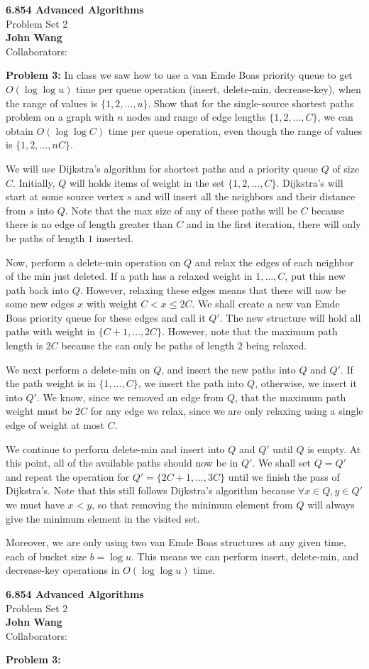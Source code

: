 \documentclass[psamsfonts]{amsart}
\newenvironment{sol}{\vspace{0.25cm}{\large \bfseries Solution:}}{\qedsymbol}
\newenvironment{prob}[1]{\begin{framed}{\large \bfseries Problem #1:}}{\end{framed}}
\newcommand{\makenewtitle}{
\begin{center}
{\huge \bfseries 6.854 Advanced Algorithms} \\
Problem Set 2\\
\vspace{0.25cm}
{\bfseries John Wang} \\
Collaborators:
\end{center}
\vspace{0.5cm}
}
\begin{document}
\newpage
\makenewtitle
\begin{prob}{3}
In class we saw how to use a van Emde Boas priority queue to get $O(\log \log u)$ time per queue operation (insert, delete-min, decrease-key), when the range of values is $\{1, 2, \ldots, u\}$. Show that for the single-source shortest paths problem on a graph with $n$ nodes and range of edge lengths $\{1,2,\ldots, C\}$, we can obtain $O(\log \log C)$ time per queue operation, even though the range of values is $\{1,2,\ldots, nC\}$. 
\end{prob}

\begin{sol}
We will use Dijkstra's algorithm for shortest paths and a priority queue $Q$ of size $C$. Initially, $Q$ will holds items of weight in the set $\{1,2,\ldots, C\}$. Dijkstra's will start at some source vertex $s$ and will insert all the neighbors and their distance from $s$ into $Q$. Note that the max size of any of these paths will be $C$ because there is no edge of length greater than $C$ and in the first iteration, there will only be paths of length $1$ inserted. 

Now, perform a delete-min operation on $Q$ and relax the edges of each neighbor of the min just deleted. If a path has a relaxed weight in $1, \ldots, C$, put this new path back into $Q$. However, relaxing these edges means that there will now be some new edges $x$ with weight $C < x \leq 2C$. We shall create a new van Emde Boas priority queue for these edges and call it $Q'$. The new structure will hold all paths with weight in $\{C+1, \ldots, 2C\}$. However, note that the maximum path length is $2C$ because the can only be paths of length $2$ being relaxed.

We next perform a delete-min on $Q$, and insert the new paths into $Q$ and $Q'$. If the path weight is in $\{1, \ldots, C\}$, we insert the path into $Q$, otherwise, we insert it into $Q'$. We know, since we removed an edge from $Q$, that the maximum path weight must be $2C$ for any edge we relax, since we are only relaxing using a single edge of weight at most $C$. 

We continue to perform delete-min and insert into $Q$ and $Q'$ until $Q$ is empty. At this point, all of the available paths should now be in $Q'$. We shall set $Q = Q'$ and repeat the operation for $Q' = \{2C+1, \ldots, 3C\}$ until we finish the pass of Dijkstra's. Note that this still follows Dijkstra's algorithm because $\forall x \in Q, y \in Q'$ we must have $x < y$, so that removing the minimum element from $Q$ will always give the minimum element in the visited set. 

Moreover, we are only using two van Emde Boas structures at any given time, each of bucket size $b = \log u$. This means we can perform insert, delete-min, and decrease-key operations in $O(\log \log u)$ time.
\end{sol}

\newpage
\makenewtitle
\begin{prob}{3}
\end{prob}
\begin{sol}
\end{sol}
\end{document}
